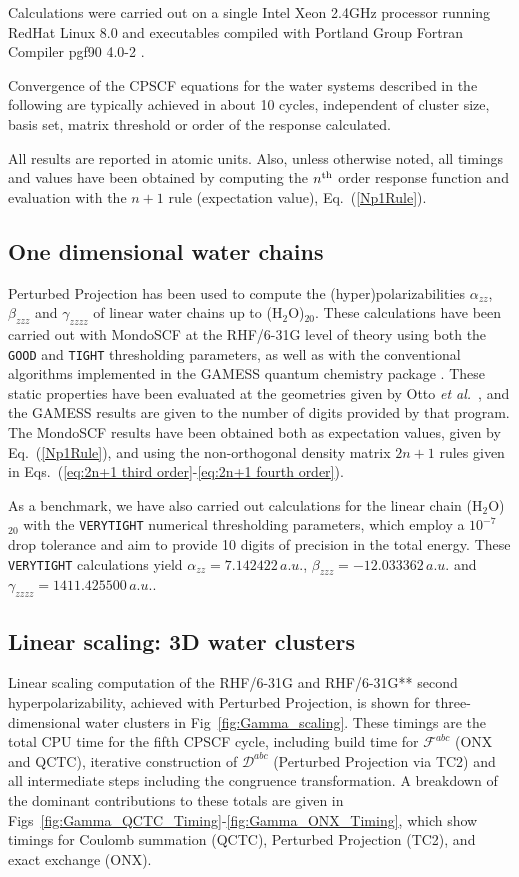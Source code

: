 \documentclass[prl,twocolumn,showpacs,twocolumngrid,superbib]{revtex4}
\def\F{\mathcal{F}}
\def\D{\mathcal{D}}
\begin{document}
Calculations were carried out on a single Intel Xeon 2.4GHz processor running RedHat Linux 8.0 and  
executables compiled with Portland Group Fortran Compiler pgf90 4.0-2 \cite{PGF90}.

Convergence of the CPSCF equations for the water systems described in the following 
are typically achieved in about 10 cycles, independent of cluster size, basis set,
matrix threshold or order of the response calculated.

All results are reported in atomic units.  Also, unless otherwise noted, all timings and values 
have been obtained by computing the $n^{\rm th}$ order response function and evaluation with the
$n+1$ rule (expectation value), Eq.~(\ref{Np1Rule}).
\subsection{One dimensional water chains}

Perturbed Projection has been used to compute the (hyper)polarizabilities $\alpha_{zz}$, 
$\beta_{zzz}$ and $\gamma_{zzzz}$ of linear water chains up to (H$_2$O)$_{20}$. 
These calculations have been carried out with {\sc MondoSCF} at the RHF/6-31G level of theory using 
both the {\tt GOOD} and {\tt TIGHT} thresholding parameters,  as well as with the conventional algorithms implemented
in the {\sc GAMESS} quantum chemistry package \cite{gamess}.  These static properties have 
been evaluated at the geometries given by Otto {\em et al.}~\cite{POtto99}, and the GAMESS
results are given to the number of digits provided by that program.
The {\sc MondoSCF} results have been obtained both as expectation values, given by Eq.~(\ref{Np1Rule}), 
and using the non-orthogonal density matrix $2 n+1$ rules given in 
Eqs.~(\ref{eq:2n+1 third order}-\ref{eq:2n+1 fourth order}).

As a benchmark, we have also carried out calculations for the linear chain (H$_2$O)$_{20}$ with 
the {\tt VERYTIGHT} numerical thresholding parameters, which employ a $10^{-7}$ drop tolerance and
aim to provide 10 digits of precision in the total energy.   These {\tt VERYTIGHT} calculations yield  
$\alpha_{zz}=7.142422\,a.u.$, $\beta_{zzz}=-12.033362\,a.u.$ and $\gamma_{zzzz}=1411.425500\,a.u.$. 

\subsection{Linear scaling: 3D water clusters}

Linear scaling computation of the RHF/6-31G and RHF/6-31G** second hyperpolarizability,
achieved with Perturbed Projection, is shown for three-dimensional water clusters 
in Fig~\ref{fig:Gamma_scaling}.  These timings are the total CPU time for the fifth CPSCF cycle, 
including build time for $\F^{abc}$ ({\sc ONX} and {\sc QCTC}), 
iterative construction of $\D^{abc}$ (Perturbed Projection via {\sc TC2}) and all intermediate
steps including the congruence transformation.
A breakdown of the dominant contributions to these totals are given
in Figs~\ref{fig:Gamma_QCTC_Timing}-\ref{fig:Gamma_ONX_Timing}, which show timings for Coulomb 
summation ({\sc QCTC}), Perturbed Projection ({\sc TC2}), and exact exchange ({\sc ONX}).
\end{document}
